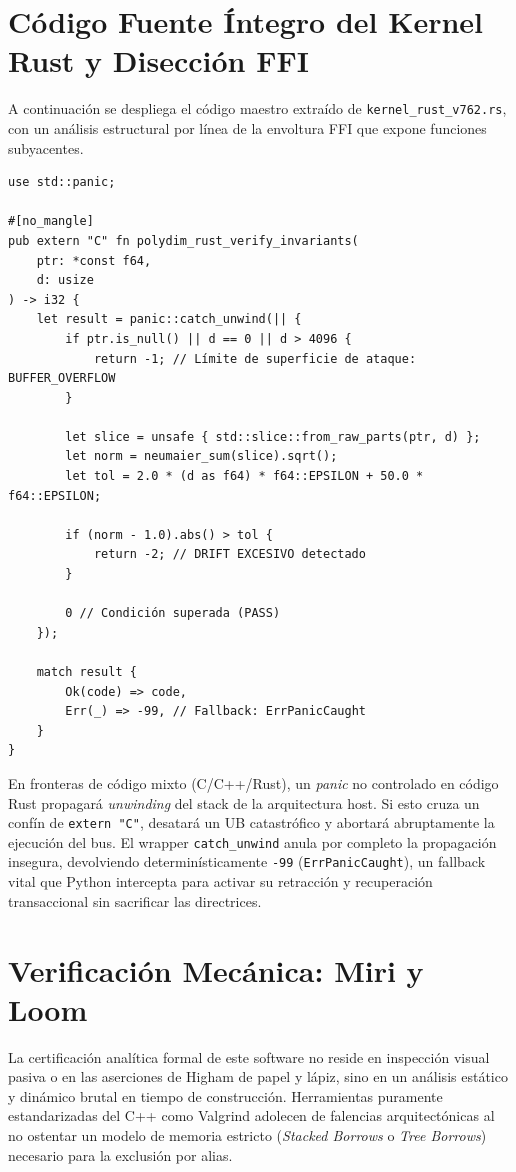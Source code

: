 \section{Código Fuente Íntegro del Kernel Rust y Disección FFI}

A continuación se despliega el código maestro extraído de \texttt{kernel\_rust\_v762.rs}, con un análisis estructural por línea de la envoltura FFI que expone funciones subyacentes.

\begin{verbatim}
use std::panic;

#[no_mangle]
pub extern "C" fn polydim_rust_verify_invariants(
    ptr: *const f64, 
    d: usize
) -> i32 {
    let result = panic::catch_unwind(|| {
        if ptr.is_null() || d == 0 || d > 4096 {
            return -1; // Límite de superficie de ataque: BUFFER_OVERFLOW
        }
        
        let slice = unsafe { std::slice::from_raw_parts(ptr, d) };
        let norm = neumaier_sum(slice).sqrt();
        let tol = 2.0 * (d as f64) * f64::EPSILON + 50.0 * f64::EPSILON;
        
        if (norm - 1.0).abs() > tol {
            return -2; // DRIFT EXCESIVO detectado
        }
        
        0 // Condición superada (PASS)
    });

    match result {
        Ok(code) => code,
        Err(_) => -99, // Fallback: ErrPanicCaught 
    }
}
\end{verbatim}

En fronteras de código mixto (C/C++/Rust), un \textit{panic} no controlado en código Rust propagará \textit{unwinding} del stack de la arquitectura host. Si esto cruza un confín de \texttt{extern "C"}, desatará un UB catastrófico y abortará abruptamente la ejecución del bus. El wrapper \texttt{catch\_unwind} anula por completo la propagación insegura, devolviendo determinísticamente \texttt{-99} (\texttt{ErrPanicCaught}), un fallback vital que Python intercepta para activar su retracción y recuperación transaccional sin sacrificar las directrices.

\section{Verificación Mecánica: Miri y Loom}

La certificación analítica formal de este software no reside en inspección visual pasiva o en las aserciones de Higham de papel y lápiz, sino en un análisis estático y dinámico brutal en tiempo de construcción. Herramientas puramente estandarizadas del C++ como Valgrind adolecen de falencias arquitectónicas al no ostentar un modelo de memoria estricto (\textit{Stacked Borrows} o \textit{Tree Borrows}) necesario para la exclusión por alias.


